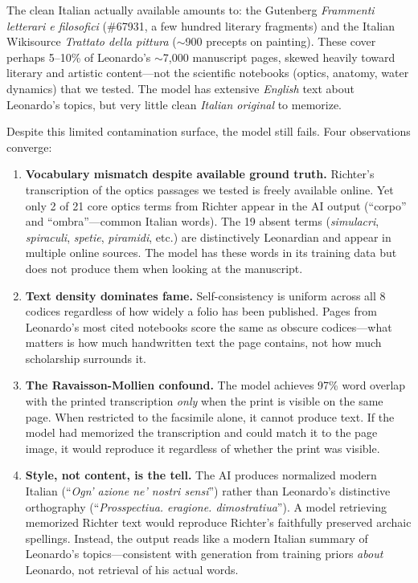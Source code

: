 \documentclass[10pt,twocolumn]{article}
\begin{document}
The clean Italian actually available amounts to: the Gutenberg \emph{Frammenti letterari e filosofici} (\#67931, a few hundred literary fragments) and the Italian Wikisource \emph{Trattato della pittura} (${\sim}$900 precepts on painting). These cover perhaps 5--10\% of Leonardo's ${\sim}$7,000 manuscript pages, skewed heavily toward literary and artistic content---not the scientific notebooks (optics, anatomy, water dynamics) that we tested. The model has extensive \emph{English} text about Leonardo's topics, but very little clean \emph{Italian original} to memorize.

Despite this limited contamination surface, the model still fails. Four observations converge:

\begin{enumerate}
\item \textbf{Vocabulary mismatch despite available ground truth.} Richter's transcription of the optics passages we tested is freely available online. Yet only 2 of 21 core optics terms from Richter appear in the AI output (``corpo'' and ``ombra''---common Italian words). The 19 absent terms (\emph{simulacri}, \emph{spiraculi}, \emph{spetie}, \emph{piramidi}, etc.) are distinctively Leonardian and appear in multiple online sources. The model has these words in its training data but does not produce them when looking at the manuscript.

\item \textbf{Text density dominates fame.} Self-consistency is uniform across all 8 codices regardless of how widely a folio has been published. Pages from Leonardo's most cited notebooks score the same as obscure codices---what matters is how much handwritten text the page contains, not how much scholarship surrounds it.

\item \textbf{The Ravaisson-Mollien confound.} The model achieves 97\% word overlap with the printed transcription \emph{only} when the print is visible on the same page. When restricted to the facsimile alone, it cannot produce text. If the model had memorized the transcription and could match it to the page image, it would reproduce it regardless of whether the print was visible.

\item \textbf{Style, not content, is the tell.} The AI produces normalized modern Italian (``\emph{Ogn' azione ne' nostri sensi}'') rather than Leonardo's distinctive orthography (``\emph{Prosspectiua. eragione. dimostratiua}''). A model retrieving memorized Richter text would reproduce Richter's faithfully preserved archaic spellings. Instead, the output reads like a modern Italian summary of Leonardo's topics---consistent with generation from training priors \emph{about} Leonardo, not retrieval of his actual words.
\end{enumerate}
\end{document}

